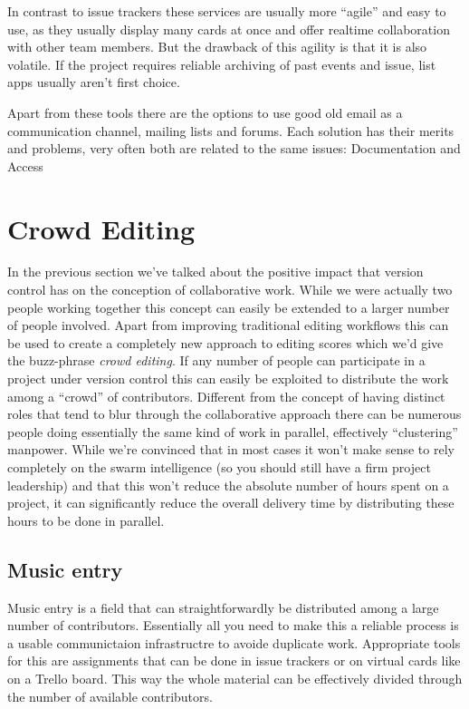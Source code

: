 \documentclass[11pt,a4paper]{article}
\begin{document}
In contrast to issue trackers these services are usually more “agile” and easy to use, as
they usually display many cards at once and offer realtime collaboration with other
team members. But the drawback of this agility is that it is also volatile. If the project
requires reliable archiving of past events and issue, list apps usually aren't first choice.

\medskip
Apart from these tools there are the options to use good old email as a communication channel, mailing lists and forums. Each solution has their merits and problems, very often both are related to the same issues: Documentation and Access


\section{Crowd Editing}
In the previous section we've talked about the positive impact that version control
has on the conception of collaborative work. While we were actually two people
working together this concept can easily be extended to a larger number of people
involved. Apart from improving traditional editing workflows this can be used to create a
completely new approach to editing scores which we'd give the buzz-phrase \emph{crowd
editing}. If any number of people can participate in a project under version control
this can easily be exploited to distribute the work among a “crowd” of contributors.
Different from the concept of having distinct roles that tend to blur through the
collaborative approach there can be numerous people doing essentially the same kind
of work in parallel, effectively “clustering” manpower. While we're convinced that
in most cases it won't make sense to rely completely on the swarm intelligence (so
you should still have a firm project leadership) and that this won't reduce the
absolute number of hours spent on a project, it can significantly reduce the overall
delivery time by distributing these hours to be done in parallel.

\subsection{Music entry}
Music entry is a field that can straightforwardly be distributed among a large number
of contributors. Essentially all you need to make this a reliable process is a usable
communictaion infrastructre to avoide duplicate work.
Appropriate tools for this are assignments that can be done in issue trackers or on
virtual cards like on a Trello board. This way the whole material can be
effectively divided through the number of available contributors.
\end{document}
